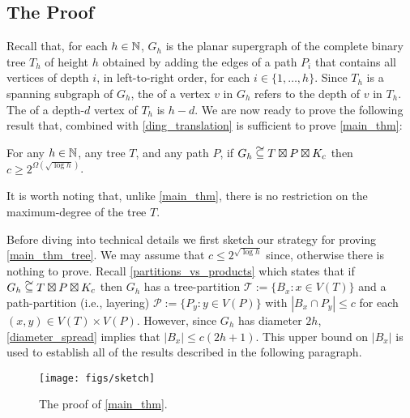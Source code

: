 \documentclass{patmorin}
\newcommand\subsetcong{\mathrel{\text{%
    \setbox0\hbox{$\subseteq$}%
    \rlap{\hbox to \wd0{\hss\hss\hss\raisebox{1.5\height}{$\sim$}\hss}}\box0
}}}
\renewcommand{\le}{\leqslant}
\renewcommand{\ge}{\geqslant}
\begin{document}
\subsection{The Proof}

Recall that, for each $h\in\mathbb{N}$, $G_{h}$ is the planar supergraph of the complete binary tree $T_h$ of height $h$ obtained by adding the edges of a path $P_i$ that contains all vertices of depth $i$, in left-to-right order, for each $i\in\{1,\ldots,h\}$.   Since $T_h$ is a spanning subgraph of $G_h$, the  of a vertex $v$ in $G_h$ refers to the depth of $v$ in $T_h$.  The  of a depth-$d$ vertex of $T_h$ is $h-d$.
We are now ready to prove the following result that, combined with \cref{ding_translation} is sufficient to prove \cref{main_thm}:

\begin{thm}\label{main_thm_tree}
  For any $h\in\mathbb{N}$, any tree $T$, and any path $P$, if $G_{h}\subsetcong T\boxtimes P\boxtimes K_c$ then $c\ge 2^{\Omega(\sqrt{\log h})}$.
\end{thm}

It is worth noting that, unlike \cref{main_thm}, there is no restriction on the maximum-degree of the tree $T$.

Before diving into technical details we first sketch our strategy for proving \cref{main_thm_tree}.  We may assume that $c \le 2^{\sqrt{\log h}}$ since, otherwise there is nothing to prove.  Recall \cref{partitions_vs_products} which states that if $G_h\subsetcong T\boxtimes P\boxtimes K_c$ then $G_h$ has a tree-partition $\mathcal{T}:=\{B_x:x\in V(T)\}$ and a path-partition (i.e., layering) $\mathcal{P}:=\{P_y:y\in V(P)\}$ with $|B_x\cap P_y|\le c$ for each $(x,y)\in V(T)\times V(P)$. However, since $G_h$ has diameter $2h$, \cref{diameter_spread} implies that $|B_x|\le c(2h+1)$. This upper bound on $|B_x|$ is used to establish all of the results described in the following paragraph.

\begin{figure}
  \begin{center}
    \texttt{[image: figs/sketch]}
  \end{center}
  \caption{The proof of \cref{main_thm}.}
  \label{sketch}
\end{figure}
\end{document}
